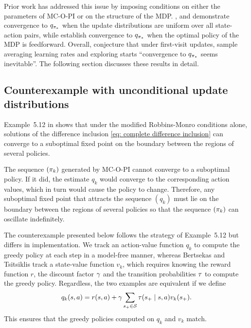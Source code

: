 Prior work has addressed this issue by imposing conditions on either the parameters of MC-O-PI or on the structure of the MDP.
\citet{Tsitsiklis2002OnIteration}, \citet{Chen2018OnProblem} and \citet{Liu2021OnStarts} demonstrate convergence to $q_{{\pi}_*}$ when the update distributions are uniform over all state-action pairs,
while \citet{Wang2022OnLearning} establish convergence to $q_{{\pi}_*}$ when the optimal policy of the MDP is feedforward.
Overall, \citet[p. 99]{Sutton2018ReinforcementIntroduction} conjecture that under first-visit updates, sample averaging learning rates and exploring starts ``convergence to $q_{{\pi}_*}$ seems inevitable''.
The following section discusses these results in detail.


\subsection{Counterexample with unconditional update distributions}
\label{sec: existing counter}

Example~5.12 in \citep{Bertsekas1996Neuro-DynamicProgramming} shows that under the modified Robbins-Monro conditions alone, solutions of the difference inclusion \eqref{eq: complete difference inclusion} can converge to a suboptimal fixed point on the boundary between the regions of several policies.

\begin{remark}
    The sequence $(\pi_k)$ generated by MC-O-PI cannot converge to a suboptimal policy. If it did, the estimate $q_k$ would converge to the corresponding action values, which in turn would cause the policy to change. Therefore, any suboptimal fixed point that attracts the sequence $(q_k)$ must lie on the boundary between the regions of several policies so that the sequence $(\pi_k)$ can oscillate indefinitely.
\end{remark}

The counterexample presented below follows the strategy of Example~5.12 but differs in implementation.
We track an action-value function $q_k$ to compute the greedy policy at each step in a model-free manner,
whereas Bertsekas and Tsitsiklis track a state-value function $v_k$, which requires knowing the reward function $r$, the discount factor $\gamma$ and the transition probabilities $\tau$ to compute the greedy policy.
Regardless, the two examples are equivalent if we define
\begin{align*}
    q_k(s,a) = r(s,a) + \gamma \sum_{s_+ \in \mathcal{S}} \tau(s_+ \mid s,a) v_k(s_+).
\end{align*}
This ensures that the greedy policies computed on $q_k$ and $v_k$ match.


